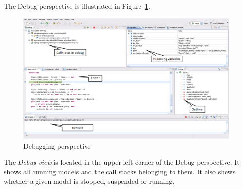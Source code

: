 {%
The Debug perspective is illustrated in Figure~\ref{fig:DebuggingVDM}.
\begin{figure}[htp]
\begin{center}
  \includegraphics[width=4.5in]{figures/DebuggingVDM}
  \caption[Debugging perspective]{Debugging perspective}
  \label{fig:DebuggingVDM}
\end{center}
\end{figure}
The \emph{Debug view} is located in the upper left corner of the Debug
perspective. It shows all running models and the call stacks belonging
to them. It also shows whether a given model is stopped, suspended or
running. 


}
